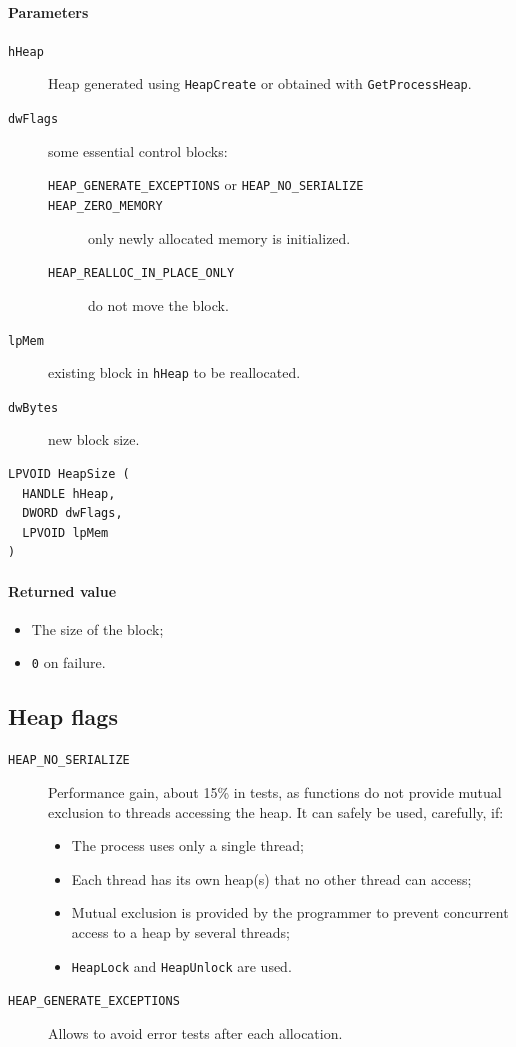 \paragraph{Parameters}
\begin{description}
\item [\texttt{hHeap}] Heap generated using \texttt{HeapCreate} or obtained with \texttt{GetProcessHeap}.
\item [\texttt{dwFlags}] some essential control blocks:
\begin{description}
\item [\texttt{HEAP\_GENERATE\_EXCEPTIONS} or \texttt{HEAP\_NO\_SERIALIZE}]
\item [\texttt{HEAP\_ZERO\_MEMORY}] only newly allocated memory is initialized.
\item [\texttt{HEAP\_REALLOC\_IN\_PLACE\_ONLY}] do not move the block.
\end{description}
\item [\texttt{lpMem}] existing block in \texttt{hHeap} to be reallocated.
\item [\texttt{dwBytes}] new block size.
\end{description}

\begin{verbatim}
LPVOID HeapSize (
  HANDLE hHeap,
  DWORD dwFlags,
  LPVOID lpMem
)
\end{verbatim}

\paragraph{Returned value}
\begin{itemize}
\item The size of the block;
\item \texttt{0} on failure.
\end{itemize}

\subsection{Heap flags}
\begin{description}
\item [\texttt{HEAP\_NO\_SERIALIZE}] Performance gain, about 15\% in tests, as functions do not provide mutual exclusion to threads accessing the heap. It can safely be used, carefully, if:
\begin{itemize}
\item The process uses only a single thread;
\item Each thread has its own heap(s) that no other thread can access;
\item Mutual exclusion is provided by the programmer to prevent concurrent access to a heap by several threads;
\item \texttt{HeapLock} and \texttt{HeapUnlock} are used.
\end{itemize}
\item [\texttt{HEAP\_GENERATE\_EXCEPTIONS}] Allows to avoid error tests after each allocation.
\end{description}


